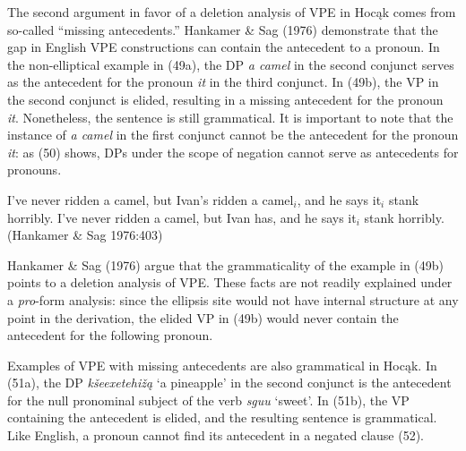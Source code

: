 \documentclass[output=paper]{LSP/langsci}
\begin{document}
The second argument in favor of a deletion analysis of VPE in Hoc\k{a}k comes from so-called ``missing antecedents.'' Hankamer \& Sag (1976) demonstrate that the gap in English VPE constructions can contain the antecedent to a pronoun. In the non-elliptical example in (49a), the DP \emph{a camel} in the second conjunct serves as the antecedent for the pronoun \emph{it} in the third conjunct. In (49b), the VP in the second conjunct is elided, resulting in a missing antecedent for the pronoun \emph{it}. Nonetheless, the sentence is still grammatical. It is important to note that the instance of \emph{a camel} in the first conjunct cannot be the antecedent for the pronoun \emph{it}: as (50) shows, DPs under the scope of negation cannot serve as antecedents for pronouns.


\begin{singlespacing}
\begin{exe}
\ex
\begin{xlist}
\ex
I've never ridden a camel, but Ivan's ridden a camel$_i$, and he says it$_i$ stank horribly.
\vspace{12pt}
\ex
I've never ridden a camel, but Ivan has, and he says it$_i$ stank horribly. (Hankamer \& Sag 1976:403)
\end{xlist}
\end{exe}
\end{singlespacing}

\begin{exe}
\end{exe}

Hankamer \& Sag (1976) argue that the grammaticality of the example in (49b) points to a deletion analysis of VPE. These facts are not readily explained under a \emph{pro}-form analysis: since the ellipsis site would not have internal structure at any point in the derivation, the elided VP in (49b) would never contain the antecedent for the following pronoun. 

Examples of VPE with missing antecedents are also grammatical in Hoc\k{a}k. In (51a), the DP \emph{k\v{s}eexetehi\v{z}\k{a}} `a pineapple' in the second conjunct is the antecedent for the null pronominal subject of the verb \emph{sguu} `sweet'. In (51b), the VP containing the antecedent is elided, and the resulting sentence is grammatical. Like English, a pronoun cannot find its antecedent in a negated clause (52).
\end{document}
